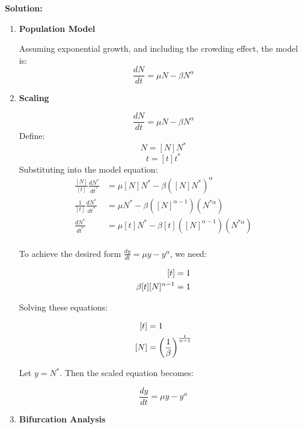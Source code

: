 \documentclass[12pt]{article}
\newenvironment{solution}{
    \textbf{Solution:}
    
}{
    
    \vspace{2em}
}
\begin{document}
\begin{solution}
    \begin{enumerate}
        \item \textbf{Population Model}
    
        Assuming exponential growth, and including the crowding effect, the model is:
        \[
        \frac{dN}{dt} = \mu N - \beta N^\alpha
        \]
    
        \item \textbf{Scaling}
        
        \[
        \frac{dN}{dt} = \mu N - \beta N^\alpha
        \]
        Define:
        \[
        N = [N]N^*
        \]
        \[
        t = [t]t^*
        \]
        Substituting into the model equation:
        \[
        \begin{aligned}
            \frac{[N]}{[t]} \frac{dN^*}{dt^*} &= \mu [N]N^* - \beta ([N]N^*)^\alpha \\
            \frac{1}{[t]} \frac{dN^*}{dt^*} &= \mu N^* - \beta ([N]^{\alpha - 1})(N^{*\alpha})\\
            \frac{dN^*}{dt^*} &= \mu [t]N^* - \beta [t]([N]^{\alpha - 1})(N^{*\alpha})\\
        \end{aligned}
        \]
        
        To achieve the desired form \(\frac{dy}{dt} = \mu y - y^\alpha\), we need:
        
        \[
        \begin{aligned}\relax
            [t] &= 1 \\
            \beta [t][N]^{\alpha-1} &= 1
        \end{aligned}
        \]
        
        Solving these equations:
        
        \[
        \begin{aligned}\relax
            [t] &= 1 \\
            [N] &= \left(\frac{1}{\beta}\right)^{\frac{1}{\alpha-1}}
        \end{aligned}
        \]
        
        Let \(y = N^*\). Then the scaled equation becomes:
        
        \[
        \frac{dy}{dt} = \mu y - y^\alpha
        \]


        
        \item \textbf{Bifurcation Analysis}
        

\end{enumerate}
\end{solution}
\end{document}
